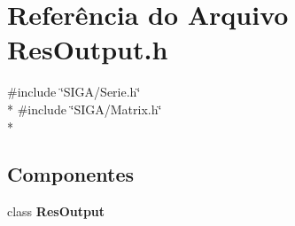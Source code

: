 \section{Referência do Arquivo Res\+Output.\+h}
\label{_res_output_8h}
{\ttfamily \#include \char`\"{}S\+I\+G\+A/\+Serie.\+h\char`\"{}}\\*
{\ttfamily \#include \char`\"{}S\+I\+G\+A/\+Matrix.\+h\char`\"{}}\\*
\subsection*{Componentes}
\begin{DoxyCompactItemize}
\item 
class {\bf Res\+Output}
\end{DoxyCompactItemize}
